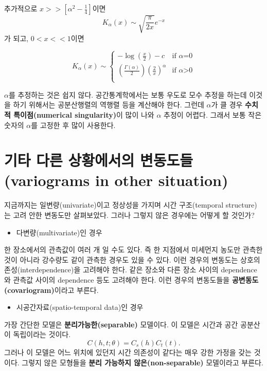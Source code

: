 \documentclass[b5paper,]{scrbook}
\providecommand{\tightlist}{%
  \setlength{\itemsep}{0pt}\setlength{\parskip}{0pt}}
\theoremstyle{plain}
\theoremstyle{definition}
\numberwithin{equation}{section}
\begin{document}
추가적으로 \(x >> [\alpha^{2}-\frac{1}{4}]\)이면
\[K_{\alpha}(x) \sim \sqrt{\frac{\pi}{2x}}e^{-x}\]
가 되고, \(0<x<<1\)이면

\[
K_{\alpha}(x) \sim \left\{ \begin{array}{ll}
-\log (\frac{x}{2}) - c & \textrm{if $\alpha$=0}\\
(\frac{\Gamma(\alpha)}{2})(\frac{2}{x})^{\alpha} & \textrm{if $\alpha$>0}\\
\end{array} \right.
\]

\(\alpha\)를 추정하는 것은 쉽지 않다. 공간통계학에서는 보통 우도로 모수 추정을 하는데 이것을 하기 위해서는 공분산행렬의 역행렬 등을 계산해야 한다. 그런데 \(\alpha\)가 클 경우 \textbf{수치적 특이점(numerical singularity)}이 많이 나와 \(\alpha\) 추정이 어렵다. 그래서 보통 작은 숫자의 \(\alpha\)를 고정한 후 많이 사용한다.

\hypertarget{---variograms-in-other-situation}{%
\section{기타 다른 상황에서의 변동도들(variograms in other situation)}\label{---variograms-in-other-situation}}

지금까지는 일변량(univariate)이고 정상성을 가지며 시간 구조(temporal structure)는 고려 안한 변동도만 살펴보았다. 그러나 그렇지 않은 경우에는 어떻게 할 것인가?

\begin{itemize}
\tightlist
\item
  다변량(multivariate)인 경우
\end{itemize}

한 장소에서의 관측값이 여러 개 일 수도 있다. 즉 한 지점에서 미세먼지 농도만 관측한 것이 아니라 강수량도 같이 관측한 경우도 있을 수 있다. 이런 경우의 변동도는 상호의존성(interdependence)을 고려해야 한다. 같은 장소와 다른 장소 사이의 dependence와 관측값 사이의 dependence 등도 고려해야 한다. 이런 경우의 변동도들을 \textbf{공변동도(covariogram)}이라고 부른다.

\begin{itemize}
\tightlist
\item
  시공간자료(spatio-temporal data)인 경우
\end{itemize}

가장 간단한 모델은 \textbf{분리가능한(separable)} 모델이다. 이 모델은 시간과 공간 공분산이 독립이라는 것이다.
\[C(h,t;\theta)=C_{s}(h)C_{t}(t).\]
그러나 이 모델은 어느 위치에 있던지 시간 의존성이 같다는 매우 강한 가정을 갖는 것이다. 그렇지 않은 모형들을 \textbf{분리 가능하지 않은(non-separable)} 모델이라고 부른다.
\end{document}
